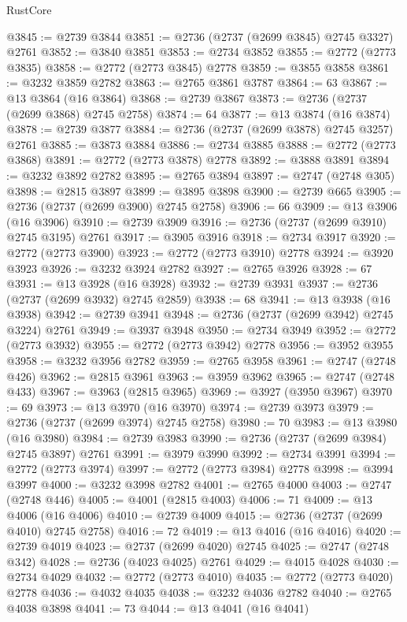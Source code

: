 \begin{lexlean}{RustCore}
\begin{coremodule}
@3845 := @2739 @3844
@3851 := @2736 (@2737 (@2699 @3845) @2745 @3327) @2761
@3852 := @3840 @3851
@3853 := @2734 @3852
@3855 := @2772 (@2773 @3835)
@3858 := @2772 (@2773 @3845) @2778
@3859 := @3855 @3858
@3861 := @3232 @3859 @2782
@3863 := @2765 @3861 @3787
@3864 := 63
@3867 := @13 @3864 (@16 @3864)
@3868 := @2739 @3867
@3873 := @2736 (@2737 (@2699 @3868) @2745 @2758)
@3874 := 64
@3877 := @13 @3874 (@16 @3874)
@3878 := @2739 @3877
@3884 := @2736 (@2737 (@2699 @3878) @2745 @3257) @2761
@3885 := @3873 @3884
@3886 := @2734 @3885
@3888 := @2772 (@2773 @3868)
@3891 := @2772 (@2773 @3878) @2778
@3892 := @3888 @3891
@3894 := @3232 @3892 @2782
@3895 := @2765 @3894
@3897 := @2747 (@2748 @305)
@3898 := @2815 @3897
@3899 := @3895 @3898
@3900 := @2739 @665
@3905 := @2736 (@2737 (@2699 @3900) @2745 @2758)
@3906 := 66
@3909 := @13 @3906 (@16 @3906)
@3910 := @2739 @3909
@3916 := @2736 (@2737 (@2699 @3910) @2745 @3195) @2761
@3917 := @3905 @3916
@3918 := @2734 @3917
@3920 := @2772 (@2773 @3900)
@3923 := @2772 (@2773 @3910) @2778
@3924 := @3920 @3923
@3926 := @3232 @3924 @2782
@3927 := @2765 @3926
@3928 := 67
@3931 := @13 @3928 (@16 @3928)
@3932 := @2739 @3931
@3937 := @2736 (@2737 (@2699 @3932) @2745 @2859)
@3938 := 68
@3941 := @13 @3938 (@16 @3938)
@3942 := @2739 @3941
@3948 := @2736 (@2737 (@2699 @3942) @2745 @3224) @2761
@3949 := @3937 @3948
@3950 := @2734 @3949
@3952 := @2772 (@2773 @3932)
@3955 := @2772 (@2773 @3942) @2778
@3956 := @3952 @3955
@3958 := @3232 @3956 @2782
@3959 := @2765 @3958
@3961 := @2747 (@2748 @426)
@3962 := @2815 @3961
@3963 := @3959 @3962
@3965 := @2747 (@2748 @433)
@3967 := @3963 (@2815 @3965)
@3969 := @3927 (@3950 @3967)
@3970 := 69
@3973 := @13 @3970 (@16 @3970)
@3974 := @2739 @3973
@3979 := @2736 (@2737 (@2699 @3974) @2745 @2758)
@3980 := 70
@3983 := @13 @3980 (@16 @3980)
@3984 := @2739 @3983
@3990 := @2736 (@2737 (@2699 @3984) @2745 @3897) @2761
@3991 := @3979 @3990
@3992 := @2734 @3991
@3994 := @2772 (@2773 @3974)
@3997 := @2772 (@2773 @3984) @2778
@3998 := @3994 @3997
@4000 := @3232 @3998 @2782
@4001 := @2765 @4000
@4003 := @2747 (@2748 @446)
@4005 := @4001 (@2815 @4003)
@4006 := 71
@4009 := @13 @4006 (@16 @4006)
@4010 := @2739 @4009
@4015 := @2736 (@2737 (@2699 @4010) @2745 @2758)
@4016 := 72
@4019 := @13 @4016 (@16 @4016)
@4020 := @2739 @4019
@4023 := @2737 (@2699 @4020) @2745
@4025 := @2747 (@2748 @342)
@4028 := @2736 (@4023 @4025) @2761
@4029 := @4015 @4028
@4030 := @2734 @4029
@4032 := @2772 (@2773 @4010)
@4035 := @2772 (@2773 @4020) @2778
@4036 := @4032 @4035
@4038 := @3232 @4036 @2782
@4040 := @2765 @4038 @3898
@4041 := 73
@4044 := @13 @4041 (@16 @4041)

\end{coremodule}
\end{lexlean}
